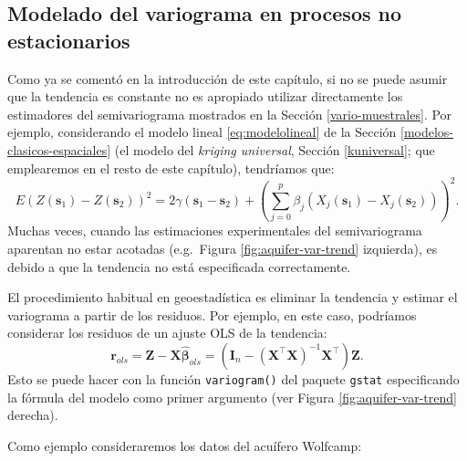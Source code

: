 \documentclass[
  spanish,
]{book}
\newenvironment{Shaded}{\begin{snugshade}}{\end{snugshade}}
\newcommand{\AttributeTok}[1]{\textcolor[rgb]{0.77,0.63,0.00}{#1}}
\newcommand{\CommentTok}[1]{\textcolor[rgb]{0.56,0.35,0.01}{\textit{#1}}}
\newcommand{\ConstantTok}[1]{\textcolor[rgb]{0.00,0.00,0.00}{#1}}
\newcommand{\DecValTok}[1]{\textcolor[rgb]{0.00,0.00,0.81}{#1}}
\newcommand{\FloatTok}[1]{\textcolor[rgb]{0.00,0.00,0.81}{#1}}
\newcommand{\FunctionTok}[1]{\textcolor[rgb]{0.00,0.00,0.00}{#1}}
\newcommand{\NormalTok}[1]{#1}
\newcommand{\SpecialCharTok}[1]{\textcolor[rgb]{0.00,0.00,0.00}{#1}}
\newcommand{\StringTok}[1]{\textcolor[rgb]{0.31,0.60,0.02}{#1}}
\theoremstyle{break}
\theoremstyle{definition}
\theoremstyle{definition}
\theoremstyle{definition}
\theoremstyle{definition}
\theoremstyle{remark}
\begin{document}
\begin{Shaded}
\end{Shaded}

\hypertarget{trend-fit}{%
\subsection{Modelado del variograma en procesos no estacionarios}\label{trend-fit}}

Como ya se comentó en la introducción de este capítulo, si no se puede asumir que la tendencia es constante no es apropiado utilizar directamente los estimadores del semivariograma mostrados en la Sección \ref{vario-muestrales}.
Por ejemplo, considerando el modelo lineal \eqref{eq:modelolineal} de la Sección \ref{modelos-clasicos-espaciales} (el modelo del \emph{kriging universal}, Sección \ref{kuniversal}; que emplearemos en el resto de este capítulo), tendríamos que:
\[E(Z(\mathbf{s}_1)-Z(\mathbf{s}_{2}))^2 =2\gamma(\mathbf{s}_1
-\mathbf{s}_{2}) + \left( \sum\limits_{j=0}^{p}\beta_{j}  \left( X_{j}
(\mathbf{s}_1)-X_{j}(\mathbf{s}_{2})\right) \right)^2.\]
Muchas veces, cuando las estimaciones experimentales del semivariograma aparentan no estar acotadas (e.g.~Figura \ref{fig:aquifer-var-trend} izquierda), es debido a que la tendencia no está especificada correctamente.

El procedimiento habitual en geoestadística es eliminar la tendencia y estimar el variograma a partir de los residuos. Por ejemplo, en este caso, podríamos considerar los residuos de un ajuste OLS de la tendencia:
\[\mathbf{r}_{ols} =\mathbf{Z}-\mathbf{X}\hat{\boldsymbol{\beta}}_{ols} =\left( \mathbf{I}_{n}
- (\mathbf{X}^{\top}\mathbf{X})^{-1}\mathbf{X}^{\top} \right)\mathbf{Z}.\]
Esto se puede hacer con la función \texttt{variogram()} del paquete \texttt{gstat} especificando la fórmula del modelo como primer argumento (ver Figura \ref{fig:aquifer-var-trend} derecha).

Como ejemplo consideraremos los datos del acuífero Wolfcamp:
\end{document}
